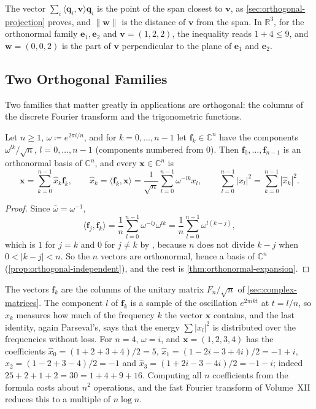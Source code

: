 The vector $\sum_i\langle\mathbf q_i,\mathbf v\rangle\mathbf q_i$ is the point of the span closest to $\mathbf v$, as \cref{sec:orthogonal-projection} proves, and $\|\mathbf w\|$ is the distance of $\mathbf v$ from the span. In $\mathbb R^3$, for the orthonormal family $\mathbf e_1,\mathbf e_2$ and $\mathbf v=(1,2,2)$, the inequality reads $1+4\le9$, and $\mathbf w=(0,0,2)$ is the part of $\mathbf v$ perpendicular to the plane of $\mathbf e_1$ and $\mathbf e_2$.

\subsection{Two Orthogonal Families}

Two families that matter greatly in applications are orthogonal: the columns of the discrete Fourier transform and the trigonometric functions.

\begin{proposition}
\label{prop:fourier-basis}
Let $n\ge1$, $\omega\coloneqq e^{2\pi i/n}$, and for $k=0,\ldots,n-1$ let $\mathbf f_k\in\mathbb C^n$ have the components $\omega^{lk}/\sqrt n$, $l=0,\ldots,n-1$ (components numbered from $0$). Then $\mathbf f_0,\ldots,\mathbf f_{n-1}$ is an orthonormal basis of $\mathbb C^n$, and every $\mathbf x\in\mathbb C^n$ is
\[
\mathbf x=\sum_{k=0}^{n-1}\hat x_k\mathbf f_k,\qquad\hat x_k=\langle\mathbf f_k,\mathbf x\rangle=\frac1{\sqrt n}\sum_{l=0}^{n-1}\omega^{-lk}x_l,\qquad\sum_{l=0}^{n-1}|x_l|^2=\sum_{k=0}^{n-1}|\hat x_k|^2 .
\]
\end{proposition}

\begin{proof}
Since $\bar\omega=\omega^{-1}$,
\[
\langle\mathbf f_j,\mathbf f_k\rangle=\frac1n\sum_{l=0}^{n-1}\omega^{-lj}\omega^{lk}=\frac1n\sum_{l=0}^{n-1}\omega^{l(k-j)},
\]
which is $1$ for $j=k$ and $0$ for $j\ne k$ by , because $n$ does not divide $k-j$ when $0<|k-j|<n$. So the $n$ vectors are orthonormal, hence a basis of $\mathbb C^n$ (\cref{prop:orthogonal-independent}), and the rest is \cref{thm:orthonormal-expansion}.
\end{proof}

The vectors $\mathbf f_k$ are the columns of the unitary matrix $F_n/\sqrt n$ of \cref{sec:complex-matrices}. The component $l$ of $\mathbf f_k$ is a sample of the oscillation $e^{2\pi ikt}$ at $t=l/n$, so $\hat x_k$ measures how much of the frequency $k$ the vector $\mathbf x$ contains, and the last identity, again Parseval's, says that the energy $\sum|x_l|^2$ is distributed over the frequencies without loss. For $n=4$, $\omega=i$, and $\mathbf x=(1,2,3,4)$ has the coefficients $\hat x_0=(1+2+3+4)/2=5$, $\hat x_1=(1-2i-3+4i)/2=-1+i$, $\hat x_2=(1-2+3-4)/2=-1$ and $\hat x_3=(1+2i-3-4i)/2=-1-i$; indeed $25+2+1+2=30=1+4+9+16$. Computing all $n$ coefficients from the formula costs about $n^2$ operations, and the fast Fourier transform of Volume~XII reduces this to a multiple of $n\log n$.

